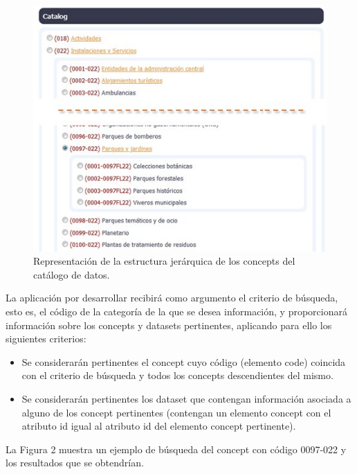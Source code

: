 \begin{figure}[H]
    \centering
    \includegraphics[width=\textwidth]{imagenes/Practica3fig1.jpg}
    \caption{Representación de la estructura jerárquica de los concepts del catálogo de datos.}
    \label{fig:Practica3fig1.jpg}
\end{figure}


La aplicación por desarrollar recibirá como argumento el criterio de búsqueda, esto es, el código de la categoría de la que se desea información, y proporcionará información sobre los concepts y datasets pertinentes, aplicando para ello los siguientes criterios:

\begin{itemize}
    \item Se considerarán pertinentes el concept cuyo código (elemento code) coincida con el criterio de búsqueda y todos los concepts descendientes del mismo.
    \item Se considerarán pertinentes los dataset que contengan información asociada a alguno de los concept pertinentes (contengan un elemento concept con el atributo id igual al atributo id del elemento concept pertinente).
\end{itemize}

La Figura 2 muestra un ejemplo de búsqueda del concept con código 0097-022 y los resultados que se obtendrían.


